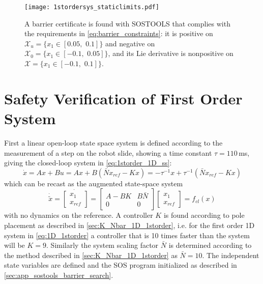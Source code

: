 \begin{figure}[htbp]
	\hspace*{-12mm}
	\texttt{[image: 1stordersys\_staticlimits.pdf]}
	\caption{A barrier certificate is found with SOSTOOLS that complies with the requirements in \autoref{eq:barrier_constraints}: it is positive on $\mathcal{X}_u=\{x_1\in [0.05,\,\,0.1]\}$ and negative on $\mathcal{X}_0=\{x_1\in [-0.1,\,\,0.05]\}$, and its Lie derivative is nonpositive on $\mathcal{X}=\{x_1\in [-0.1,\,\,0.1]\}$.}
	\label{fig:barrier_1storder_staticlim}
\end{figure}



\section{Safety Verification of First Order System}
First a linear open-loop state space system is defined according to the measurement of a step on the robot slide, showing a time constant $\tau=110$\,ms, giving the closed-loop system in \autoref{eq:1storder_1D_ss}:
\begin{equation}
\dot{x} = Ax+Bu = Ax+B(\bar{N}x_{ref}-Kx) = %
-\tau^{-1}x+\tau^{-1}(\bar{N}x_{ref}-Kx)
\label{eq:1D_1storder}
\end{equation} 
which can be recast as the augmented state-space system
\begin{equation}
\dot{\tilde{x}}=
\dot{\begin{bmatrix}
	x_1\\x_{ref}
	\end{bmatrix}} =
\begin{bmatrix}
A-BK&B\bar{N}\\0&0
\end{bmatrix}
\begin{bmatrix}
x_1\\x_{ref}
\end{bmatrix}
= f_{cl}(x)
\label{eq:xtilde_1storder_1D}
\end{equation}
with no dynamics on the reference. A controller $K$ is found according to pole placement as described in \autoref{sec:K_Nbar_1D_1storder}, i.e. for the first order 1D system in \autoref{eq:1D_1storder} a controller that is 10 times faster than the system will be $K=9$. Similarly the system scaling factor $\bar{N}$ is determined according to the method described in \autoref{sec:K_Nbar_1D_1storder} as $\bar{N}=10$.
The independent state variables are defined and the SOS program initialized as described in \autoref{sec:app_sostools_barrier_search}.

